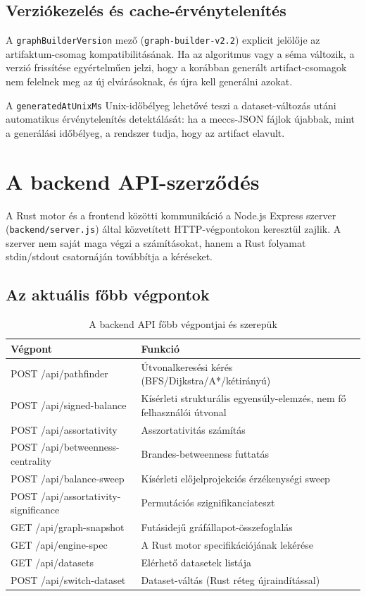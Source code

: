 ﻿\documentclass[a4paper,12pt]{report}
\begin{document}
\subsection{Verziókezelés és cache-érvénytelenítés}

A \texttt{graphBuilderVersion} mező (\texttt{graph-builder-v2.2}) explicit jelölője az artifaktum-csomag kompatibilitásának. Ha az algoritmus vagy a séma változik, a verzió frissítése egyértelműen jelzi, hogy a korábban generált artifact-csomagok nem felelnek meg az új elvárásoknak, és újra kell generálni azokat.

A \texttt{generatedAtUnixMs} Unix-időbélyeg lehetővé teszi a dataset-változás utáni automatikus érvénytelenítés detektálását: ha a meccs-JSON fájlok újabbak, mint a generálási időbélyeg, a rendszer tudja, hogy az artifact elavult.

\section{A backend API-szerződés}

A Rust motor és a frontend közötti kommunikáció a Node.js Express szerver (\texttt{backend/server.js}) által közvetített HTTP-végpontokon keresztül zajlik. A szerver nem saját maga végzi a számításokat, hanem a Rust folyamat stdin/stdout csatornáján továbbítja a kéréseket.

\subsection{Az aktuális főbb végpontok}

\begin{table}[H]
\centering
\caption{A backend API főbb végpontjai és szerepük}
\small
\begin{tabularx}{\textwidth}{>{\ttfamily\raggedright\arraybackslash}p{5.5cm} >{\raggedright\arraybackslash}X}
\toprule
\textbf{Végpont} & \textbf{Funkció} \\
\midrule
POST /api/pathfinder & Útvonalkeresési kérés (BFS/Dijkstra/A*/kétirányú) \\
POST /api/signed-balance & Kísérleti strukturális egyensúly-elemzés, nem fő felhasználói útvonal \\
POST /api/assortativity & Asszortativitás számítás \\
POST /api/betweenness-centrality & Brandes-betweenness futtatás \\
POST /api/balance-sweep & Kísérleti előjelprojekciós érzékenységi sweep \\
POST /api/assortativity-significance & Permutációs szignifikanciateszt \\
GET /api/graph-snapshot & Futásidejű gráfállapot-összefoglalás \\
GET /api/engine-spec & A Rust motor specifikációjának lekérése \\
GET /api/datasets & Elérhető datasetek listája \\
POST /api/switch-dataset & Dataset-váltás (Rust réteg újraindítással) \\
\bottomrule
\end{tabularx}
\normalsize
\end{table}
\end{document}
